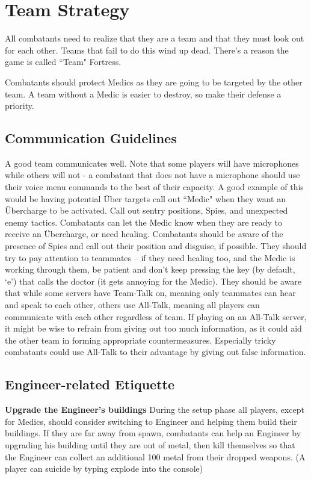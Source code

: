 \section{Team Strategy}
\label{Team_Strategy}
All combatants need to realize that they are a team and that they must look out for each other. Teams that fail to do this wind up dead. There's a reason the game is called ``Team" Fortress.

Combatants should protect Medics as they are going to be targeted by the other team. A team without a Medic is easier to destroy, so make their defense a priority.

\subsection{Communication Guidelines}
A good team communicates well. Note that some players will have microphones while others will not - a combatant that does not have a microphone should use their voice menu commands to the best of their capacity. A good example of this would be having potential Über targets call out ``Medic" when they want an Übercharge to be activated. Call out sentry positions, Spies, and unexpected enemy tactics.  Combatants can let the Medic know when they are ready to receive an Übercharge, or need healing. Combatants should be aware of the presence of Spies and call out their position and disguise, if possible. They should try to pay attention to teammates -- if they need healing too, and the Medic is working through them, be patient and don't keep pressing the key (by default, `e') that calls the doctor (it gets annoying for the Medic).  They should be aware that while some servers have Team-Talk on, meaning only teammates can hear and speak to each other, others use All-Talk, meaning all players can communicate with each other regardless of team.  If playing on an All-Talk server, it might be wise to refrain from giving out too much information, as it could aid the other team in forming appropriate countermeasures.  Especially tricky combatants could use All-Talk to their advantage by giving out false information.

\subsection{Engineer-related Etiquette}
\textbf{Upgrade the Engineer's buildings} During the setup phase all players, except for Medics, should consider switching to Engineer and helping them build their buildings. If they are far away from spawn, combatants can help an Engineer by upgrading his building until they are out of metal, then kill
themselves so that the Engineer can collect an additional 100 metal from their dropped weapons. (A player can suicide by typing explode into the console)

